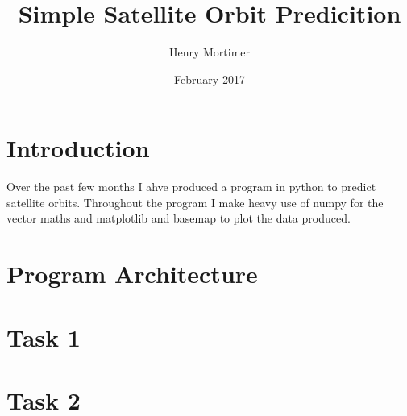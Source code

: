 \documentclass[12pt, a4paper]{article}
\begin{document}
\title{Simple Satellite Orbit Predicition}
\author{Henry Mortimer}
\date{February 2017}
\maketitle

\section{Introduction}
Over the past few months I ahve produced a program in python to predict satellite orbits. Throughout the program I make heavy use of numpy for the vector maths and matplotlib and basemap to plot the data produced.
\section{Program Architecture}

\section{Task 1}

\section{Task 2}
\end{document}
